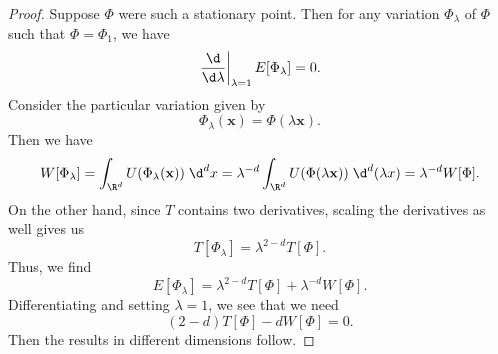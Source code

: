 \documentclass[a4paper]{article}
\begin{document}
\begin{proof}
  Suppose $\Phi$ were such a stationary point. Then for any variation $\Phi_\lambda$ of $\Phi$ such that $\Phi = \Phi_1$, we have
  \[
    \left.\frac{\d}{\d \lambda}\right|_{\lambda = 1}E[\Phi_\lambda] = 0.
  \]
  Consider the particular variation given by
  \[
    \Phi_\lambda(\mathbf{x}) = \Phi(\lambda \mathbf{x}).
  \]
  Then we have
  \[
    W[\Phi_\lambda] = \int_{\R^d} U(\Phi_\lambda(\mathbf{x})) \;\d^d x = \lambda^{-d} \int_{\R^d} U(\Phi(\lambda \mathbf{x}))\;\d^d (\lambda x) = \lambda^{-d} W[\Phi].
  \]
  On the other hand, since $T$ contains two derivatives, scaling the derivatives as well gives us
  \[
    T[\Phi_\lambda] = \lambda^{2 -d} T[\Phi].
  \]
  Thus, we find
  \[
    E[\Phi_\lambda] = \lambda^{2 - d}T[\Phi] + \lambda^{-d} W[\Phi].
  \]
  Differentiating and setting $\lambda = 1$, we see that we need
  \[
    (2 - d) T[\Phi] - d W[\Phi] = 0.
  \]
  Then the results in different dimensions follow.
\end{proof}
%
%
%
\end{document}

